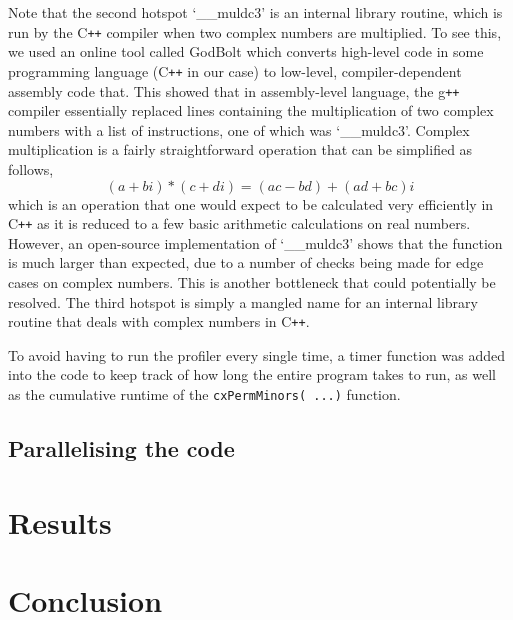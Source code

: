 \documentclass[11pt]{article}
\theoremstyle{theorem}
\theoremstyle{remark}
\theoremstyle{plain}
\theoremstyle{definition}
\begin{document}
Note that the second hotspot `\_\_muldc3' is an internal library routine, which is run by the C\texttt{++} compiler when two complex numbers are multiplied. To see this, we used an online tool called GodBolt \cite{god-bolt} which converts high-level code in some programming language (C\texttt{++} in our case) to low-level, compiler-dependent assembly code that. This showed that in assembly-level language, the g\texttt{++} compiler essentially replaced lines containing the multiplication of two complex numbers with a list of instructions, one of which was `\_\_muldc3'. Complex multiplication is a fairly straightforward operation that can be simplified as follows,
\begin{equation}
(a + bi) * (c+di) = (ac - bd) + (ad + bc)i
\end{equation}
which is an operation that one would expect to be calculated very efficiently in C\texttt{++} as it is reduced to a few basic arithmetic calculations on real numbers. However, an open-source implementation of `\_\_muldc3' \cite{muldc3} shows that the function is much larger than expected, due to a number of checks being made for edge cases on complex numbers. This is another bottleneck that could potentially be resolved. The third hotspot is simply a mangled name for an internal library routine that deals with complex numbers in C\texttt{++}.

To avoid having to run the profiler every single time, a timer function was added into the code to keep track of how long the entire program takes to run, as well as the cumulative runtime of the \texttt{cxPermMinors( ...)} function.

\subsection{Parallelising the code}


\section{Results}
\section{Conclusion}



\end{document}
